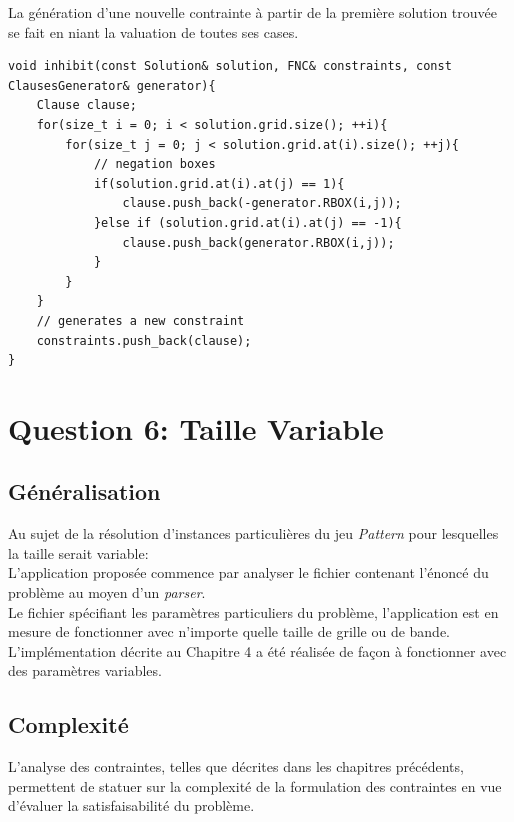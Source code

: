 \documentclass[a4paper,12pt]{report}
\begin{document}
La génération d'une nouvelle contrainte à partir de la première solution trouvée se fait en niant la valuation de toutes ses cases.
\lstset{style=Cpp, caption=Création de la contrainte, label=C:Constraint}
\begin{lstlisting}[mathescape=true]
void inhibit(const Solution& solution, FNC& constraints, const ClausesGenerator& generator){
	Clause clause;
	for(size_t i = 0; i < solution.grid.size(); ++i){
		for(size_t j = 0; j < solution.grid.at(i).size(); ++j){
			// negation boxes
			if(solution.grid.at(i).at(j) == 1){
				clause.push_back(-generator.RBOX(i,j));
			}else if (solution.grid.at(i).at(j) == -1){
				clause.push_back(generator.RBOX(i,j));
			}
		}
	}
	// generates a new constraint
	constraints.push_back(clause);
}
\end{lstlisting}

\chapter{Question 6: Taille Variable}

\section{Généralisation}
Au sujet de la résolution d'instances particulières du jeu \textit{Pattern} pour lesquelles la taille serait variable:\\

L'application proposée commence par analyser le fichier contenant l'énoncé du problème au moyen d'un \textit{parser}.\\
Le fichier spécifiant les paramètres particuliers du problème, l'application est en mesure de fonctionner avec n'importe quelle taille de grille ou de bande. \\

L'implémentation décrite au Chapitre 4 a été réalisée de façon à fonctionner avec des paramètres variables.\\
\section{Complexité}
%
%
%
%
L'analyse des contraintes, telles que décrites dans les chapitres précédents, permettent de statuer sur la complexité de la formulation des contraintes en vue d'évaluer la satisfaisabilité du problème.\\
\end{document}
